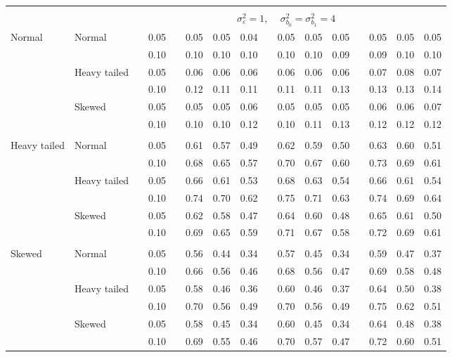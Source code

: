 \documentclass{article} %
\begin{document}
\begin{table}[ht]
\begin{scriptsize}
\begin{center}
\begin{tabular}{ll p{.1cm} c p{.1cm} rrr p{.1cm} rrr p{.1cm} rrr}
&&&&&&&&&&&&&&&\\
& && && \multicolumn{9}{c}{$\sigma_{\varepsilon}^2 = 1$, \ \ $\sigma_{b_0}^2 = \sigma_{b_1}^2 = 4$} \\ \cline{6-16}
\rowcolor{gray!20}Normal       & Normal       && 0.05 &&   0.05 & 0.05 & 0.04 && 0.05 & 0.05 & 0.05 &&  0.05 & 0.05 & 0.05 \\
\rowcolor{gray!20}             &              && 0.10 &&   0.10 & 0.10 & 0.10 && 0.10 & 0.10 & 0.09 &&  0.09 & 0.10 & 0.10 \\
\rowcolor{gray!20}             & Heavy tailed && 0.05 &&   0.06 & 0.06 & 0.06 && 0.06 & 0.06 & 0.06 &&  0.07 & 0.08 & 0.07 \\
\rowcolor{gray!20}             &              && 0.10 &&   0.12 & 0.11 & 0.11 && 0.11 & 0.11 & 0.13 &&  0.13 & 0.13 & 0.14 \\
\rowcolor{gray!20}             & Skewed       && 0.05 &&   0.05 & 0.05 & 0.06 && 0.05 & 0.05 & 0.05 &&  0.06 & 0.06 & 0.07 \\
\rowcolor{gray!20}             &              && 0.10 &&   0.10 & 0.10 & 0.12 && 0.10 & 0.11 & 0.13 &&  0.12 & 0.12 & 0.12 \\
             &&&&&&&&&&&&&&&\\
Heavy tailed & Normal       && 0.05 &&   0.61 & 0.57 & 0.49 && 0.62 & 0.59 & 0.50 &&  0.63 & 0.60 & 0.51 \\
             &              && 0.10 &&   0.68 & 0.65 & 0.57 && 0.70 & 0.67 & 0.60 &&  0.73 & 0.69 & 0.61 \\
             & Heavy tailed && 0.05 &&   0.66 & 0.61 & 0.53 && 0.68 & 0.63 & 0.54 &&  0.66 & 0.61 & 0.54 \\
             &              && 0.10 &&   0.74 & 0.70 & 0.62 && 0.75 & 0.71 & 0.63 &&  0.74 & 0.69 & 0.64 \\
             & Skewed       && 0.05 &&   0.62 & 0.58 & 0.47 && 0.64 & 0.60 & 0.48 &&  0.65 & 0.61 & 0.50 \\
             &              && 0.10 &&   0.69 & 0.65 & 0.59 && 0.71 & 0.67 & 0.58 &&  0.72 & 0.69 & 0.61 \\
             &&&&&&&&&&&&&&&\\
Skewed       & Normal       && 0.05 &&   0.56 & 0.44 & 0.34 && 0.57 & 0.45 & 0.34 &&  0.59 & 0.47 & 0.37 \\
             &              && 0.10 &&   0.66 & 0.56 & 0.46 && 0.68 & 0.56 & 0.47 &&  0.69 & 0.58 & 0.48 \\
             & Heavy tailed && 0.05 &&   0.58 & 0.46 & 0.36 && 0.60 & 0.46 & 0.37 &&  0.64 & 0.50 & 0.38 \\
             &              && 0.10 &&   0.70 & 0.56 & 0.49 && 0.70 & 0.56 & 0.49 &&  0.75 & 0.62 & 0.51 \\
             & Skewed       && 0.05 &&   0.58 & 0.45 & 0.34 && 0.60 & 0.45 & 0.34 &&  0.64 & 0.48 & 0.38 \\
             &              && 0.10 &&   0.69 & 0.55 & 0.46 && 0.70 & 0.57 & 0.47 &&  0.72 & 0.60 & 0.51 \\


\end{tabular}
\end{center}
\end{scriptsize}
\end{table}
\end{document}
